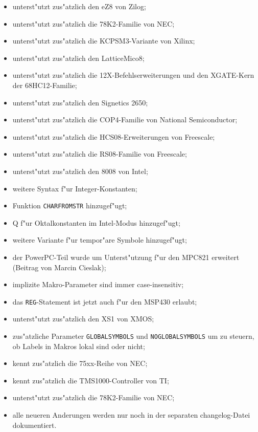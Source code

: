 \documentclass[12pt,a4paper,twoside]{report}
\newcommand{\tty}[1]{{\tt #1}}
\begin{document}
\begin{itemize}
{\begin{itemize}
      \item{unterst"utzt zus"atzlich den eZ8 von Zilog;}
      \item{unterst"utzt zus"atzlich die 78K2-Familie von NEC;}
      \item{unterst"utzt zus"atzlich die KCPSM3-Variante von Xilinx;}
      \item{unterst"utzt zus"atzlich den LatticeMico8;}
      \item{unterst"utzt zus"atzlich die 12X-Befehlserweiterungen
            und den XGATE-Kern der 68HC12-Familie;}
      \item{unterst"utzt zus"atzlich den Signetics 2650;}
      \item{unterst"utzt zus"atzlich die COP4-Familie von National
            Semiconductor;}
      \item{unterst"utzt zus"atzlich die HCS08-Erweiterungen von Freescale;}
      \item{unterst"utzt zus"atzlich die RS08-Familie von Freescale;}
      \item{unterst"utzt zus"atzlich den 8008 von Intel;}
      \item{weitere Syntax f"ur Integer-Konstanten;}
      \item{Funktion \tty{CHARFROMSTR} hinzugef"ugt;}
      \item{Q f"ur Oktalkonstanten im Intel-Modus hinzugef"ugt;}
      \item{weitere Variante f"ur tempor"are Symbole hinzugef"ugt;}
      \item{der PowerPC-Teil wurde um Unterst"utzung f"ur den MPC821 erweitert
            (Beitrag von Marcin Cieslak);}
      \item{implizite Makro-Parameter sind immer case-insensitiv;}
      \item{das \tty{REG}-Statement ist jetzt auch f"ur den MSP430
            erlaubt;}
      \item{unterst"utzt zus"atzlich den XS1 von XMOS;}
      \item{zus"atzliche Parameter \tty{GLOBALSYMBOLS} und
            \tty{NOGLOBALSYMBOLS} um zu steuern, ob Labels
            in Makros lokal sind oder nicht;}
      \item{kennt zus"atzlich die 75xx-Reihe von NEC;}
      \item{kennt zus"atzlich die TMS1000-Controller von TI;}
      \item{unterst"utzt zus"atzlich die 78K2-Familie von NEC;}
      \item{alle neueren Anderungen werden nur noch in der
            separaten changelog-Datei dokumentiert.}
      \end{itemize}}
\end{itemize}
\end{document}
